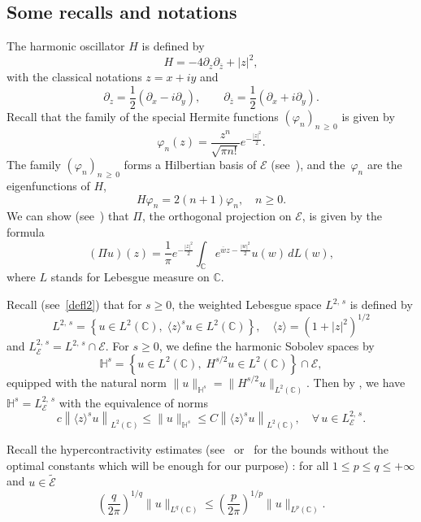 \documentclass[10pt]{amsart}
\theoremstyle{definition}\newtheorem{defi}[theo]{Definition}\newtheorem{rema}[theo]{Remark}\newtheorem{exam}[theo]{Example}\newtheorem{exem}[theo]{Example}\newtheorem{nota}[theo]{Notation}
\newcommand{\C}{\mathbb{C}}
\newcommand{\HH}{\mathbb{H}}
\newcommand{\E}{\mathcal{E}}
\newcommand{\ov}{\overline}
\newcommand{\wt}{\widetilde}
\newcommand{\<}{\langle}
\renewcommand{\>}{\rangle}
\renewcommand{\phi}{\varphi}
\let\oldforall\forall
\renewcommand*{\forall}{\mathrel{\oldforall}}
\begin{document}
\subsection{Some recalls and notations}

The harmonic oscillator $H$ is defined by
\[
H = -4\partial_z \partial_{\ov z}+|z|^2,
\]
with the classical notations $z=x+iy$ and
\[
\partial_z=\frac12\left(\partial_x-i\partial_y\right), \qquad \partial_{\ov{z}}=\frac12\left(\partial_x+i\partial_y\right).
\]
Recall that the family of the special Hermite functions $(\phi_n)_{n\,\geq\,0}$ is given by
\[
\varphi_n(z) = \frac{z^n}{\sqrt{\pi n!}} e^{-\frac{|z|^2}{2}}.
\]
The family $(\phi_n)_{n\,\geq\,0}$ forms a Hilbertian basis of $\E$ (see~\cite[Proposition~2.1]{Zhu}), and the~$\phi_n$ are the eigenfunctions of $H$,
\[
H\phi_n=2(n+1)\phi_n, \quad n\geq 0.
\]
We can show (see~\cite{GGT}) that $\Pi$, the orthogonal projection on $\E$, is given by the formula
\begin{equation}\label{ker-pi}
(\Pi u)(z) = \frac{1}{\pi} e^{-\frac{|z|^2}{2}} \int_\C e^{\ov w z - \frac{|w|^2}{2}} u(w) \,dL(w),
\end{equation}
where $L$ stands for Lebesgue measure on $\C$.

Recall (see~\eqref{defl2}) that for $s\geq 0$, the weighted Lebesgue space $L^{2,\,s}$ is defined by
\[
L^{2,\,s}=\left\{u\in L^2(\C), \;\<z\>^su \in L^2(\C)\right\}, \quad \<z\>=\left(1+|z|^2\right)^{1/2}
\]
and $L^{2,\,s}_{\E}=L^{2,\,s} \cap \E$. For $s \geq 0$, we define the harmonic Sobolev spaces by
\[
\HH^{s} = \left\{ u\in L^2(\C),\; {H}^{s/2}u\in L^2(\C)\right\}\cap \E,
\]
equipped with the natural norm $ \|u\|_{\HH^s} =\|H^{s/2} u\|_{L^2(\C)}$. Then by \cite[Lem\-ma~C.1]{GGT}, we have $\HH^{s} = L^{2,\,s}_{\E}$ with the equivalence of norms
\begin{equation}\label{eqiv-0}
c\left\|\<z\>^s u\right\|_{L^2(\C)} \leq \|u\|_{\HH^s} \leq C\left\|\<z\>^s u\right\|_{L^2(\C)}, \quad \forall\,u \in L^{2,\,s}_{\E}.
\end{equation}

Recall the hypercontractivity estimates (see~\cite{Carlen} or~\cite[Lemma~A.2]{Schw-Tho} for the bounds without the optimal constants which will be enough for our purpose) : for all $1 \leq p \leq q \leq +\infty$ and $u
\in \wt{\E}$
\begin{equation}\label{hyper}
\left(\frac{q}{2\pi} \right)^{1/q} \| u \|_{L^q(\C)} \leq \left(\frac{p}{2\pi} \right)^{1/p} \| u \|_{L^p(\C)}.
\end{equation}
\end{document}
